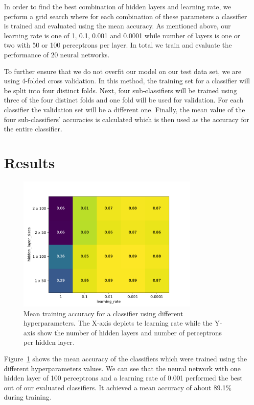 \documentclass[sigconf]{acmart}
\begin{document}
In order to find the best combination of hidden layers and learning rate, we perform a grid search where for each combination of these parameters a classifier is trained and evaluated using the mean accuracy. As mentioned above, our learning rate is one of 1, 0.1, 0.001 and 0.0001 while number of layers is one or two with 50 or 100 perceptrons per layer. In total we train and evaluate the performance of 20 neural networks.

To further ensure that we do not overfit our model on our test data set, we are using 4-folded cross validation. In this method, the training set for a classifier will be split into four distinct folds. Next, four sub-classifiers will be trained using three of the four distinct folds and one fold will be used for validation. For each classifier the validation set will be a different one. Finally, the mean value of the four sub-classifiers' accuracies is calculated which is then used as the accuracy for the entire classifier\cite{introduction_ml}.

\section{Results}

\begin{figure}
	\centering
	\includegraphics[width=9cm]{fig2.pdf}
	\caption{Mean training accuracy for a classifier using different hyperparameters. The X-axis depicts te learning rate while the Y-axis show the number of hidden layers and number of perceptrons per hidden layer.}
	\label{fig:heatmap}
\end{figure}


Figure~\ref{fig:heatmap} shows the mean accuracy of the classifiers which were trained using the different hyperparameters values. We can see that the neural network with one hidden layer of 100 perceptrons and a learning rate of 0.001 performed the best out of our evaluated classifiers. It achieved a mean accuracy of about 89.1\% during training. 
\end{document}

